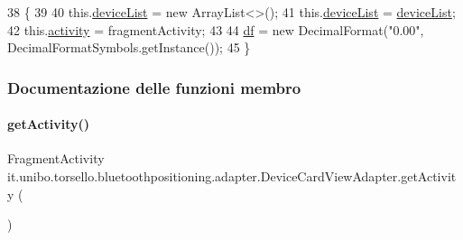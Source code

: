 \begin{DoxyCode}
38                                                                                                    \{
39 
40         this.\hyperlink{classit_1_1unibo_1_1torsello_1_1bluetoothpositioning_1_1adapter_1_1DeviceCardViewAdapter_a72413f87c723c585bd1ad9bc5711cf39_a72413f87c723c585bd1ad9bc5711cf39}{deviceList} = \textcolor{keyword}{new} ArrayList<>();
41         this.\hyperlink{classit_1_1unibo_1_1torsello_1_1bluetoothpositioning_1_1adapter_1_1DeviceCardViewAdapter_a72413f87c723c585bd1ad9bc5711cf39_a72413f87c723c585bd1ad9bc5711cf39}{deviceList} = \hyperlink{classit_1_1unibo_1_1torsello_1_1bluetoothpositioning_1_1adapter_1_1DeviceCardViewAdapter_a72413f87c723c585bd1ad9bc5711cf39_a72413f87c723c585bd1ad9bc5711cf39}{deviceList};
42         this.\hyperlink{classit_1_1unibo_1_1torsello_1_1bluetoothpositioning_1_1adapter_1_1DeviceCardViewAdapter_ad9b0572ad094da8225f1c2024ac2eb61_ad9b0572ad094da8225f1c2024ac2eb61}{activity} = fragmentActivity;
43 
44         \hyperlink{classit_1_1unibo_1_1torsello_1_1bluetoothpositioning_1_1adapter_1_1DeviceCardViewAdapter_ae3a2fe6b4e69e1f9b8edfb9bcba14057_ae3a2fe6b4e69e1f9b8edfb9bcba14057}{df} = \textcolor{keyword}{new} DecimalFormat(\textcolor{stringliteral}{"0.00"}, DecimalFormatSymbols.getInstance());
45     \}
\end{DoxyCode}


\subsubsection{Documentazione delle funzioni membro}
\hypertarget{classit_1_1unibo_1_1torsello_1_1bluetoothpositioning_1_1adapter_1_1DeviceCardViewAdapter_a0ff32c6bf5d84b68021bf586d64cacaf_a0ff32c6bf5d84b68021bf586d64cacaf}{}\label{classit_1_1unibo_1_1torsello_1_1bluetoothpositioning_1_1adapter_1_1DeviceCardViewAdapter_a0ff32c6bf5d84b68021bf586d64cacaf_a0ff32c6bf5d84b68021bf586d64cacaf} 
\paragraph{\texorpdfstring{get\+Activity()}{getActivity()}}
{\footnotesize\ttfamily Fragment\+Activity it.\+unibo.\+torsello.\+bluetoothpositioning.\+adapter.\+Device\+Card\+View\+Adapter.\+get\+Activity (\begin{DoxyParamCaption}{ }\end{DoxyParamCaption})\hspace{0.3cm}{\ttfamily [private]}}


